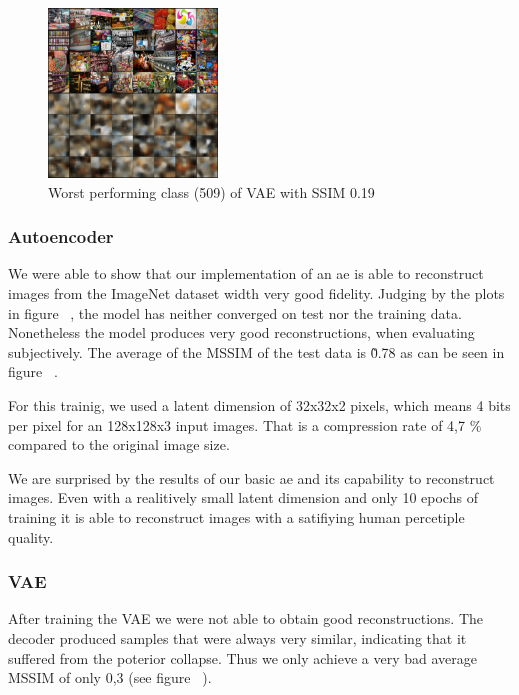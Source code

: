     \begin{figure}
        \centering
        \includegraphics[width=0.4\textwidth]{../../sample_images/evaluation/MIN_VAE_IDX_509.png}
        \caption{Worst performing class (509) of VAE with SSIM 0.19}
        \label{fig:imnet_dimensions}
    \end{figure}
    
    \subsubsection{Autoencoder}\label{subsubsec:autoencoder}
        We were able to show that our implementation of an \ac{ae} is able to reconstruct images from the ImageNet dataset width very good fidelity.
        Judging by the plots in figure ~\cite{citationNeeded}, the model has neither converged on test nor the training data.
        Nonetheless the model produces very good reconstructions, when evaluating subjectively.
        The average of the MSSIM of the test data is \~0.78 as can be seen in figure ~\cite{citationNeeded}.

        For this trainig, we used a latent dimension of 32x32x2 pixels, which means 4 bits per pixel for an 128x128x3 input images. That is a compression rate of 4,7 \% compared to the original image size.

        We are surprised by the results of our basic \ac{ae} and its capability to reconstruct images. Even with a realitively small latent dimension and only 10 epochs of training it is able to reconstruct images with a satifiying human percetiple quality.
    
    \subsubsection{VAE}\label{subsubsec:vae_training}
        After training the VAE we were not able to obtain good reconstructions.
        The decoder produced samples that were always very similar, indicating that it suffered from the poterior collapse.
        Thus we only achieve a very bad average MSSIM of only 0,3 (see figure ~\cite{citationNeeded}).


